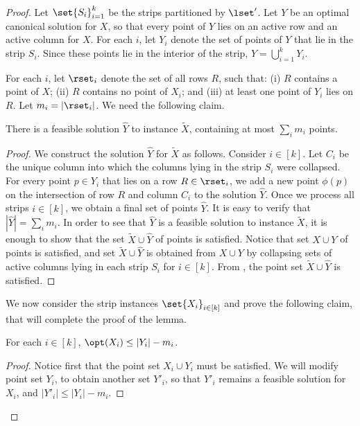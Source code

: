 \begin{proof}        

Let $\set{S_i}_{i=1}^k$ be the strips partitioned by $\lset'$. 
Let $Y$ be an optimal canonical solution for $X$, so that every point of $Y$ lies on an active row and an active column for $X$. For each $i$, let $Y_i$ denote the set of points of $Y$ that lie in the strip $S_i$. Since these points  lie in the interior of the strip,  $Y = \bigcup_{i=1}^k Y_i$. 
        
        
        For each $i$, let $\rset_i$ denote the set of all rows $R$, such that: (i) $R$ contains a point of $X$; (ii) $R$ contains no point of $X_i$; and (iii) at least one point of $Y_i$ lies on $R$. Let $m_i=|\rset_i|$.
      We need the following claim.
         
        \begin{claim}
                There is a feasible solution $\hat{Y}$ to instance $\tilde{X}$, containing at most $\sum_{i} m_i$ points. 
        \end{claim}
        \begin{proof}
                We construct the solution $\hat{Y}$ for $\tilde{X}$ as follows. 
                Consider $i \in [k]$. Let $C_i$ be the unique column into which the columns lying in the strip $S_i$ were collapsed. For every point $p\in Y_i$ that lies on a row $R\in\rset_i$, we add a new point $\phi(p)$ on the intersection of row $R$ and column $C_i$ to the solution $\hat Y$. Once we process all strips $i \in [k]$, we obtain a final set of points $\hat Y$. It is easy to verify that  $|\hat{Y}| = \sum_i m_i$. 
In order to see that $\hat Y$ is a feasible solution to instance $\tilde{X}$, it is enough to show that the set $\tilde{X}\cup \hat Y$ of points is satisfied. 
Notice that set $X\cup Y$ of points is satisfied, and set $\tilde{X}\cup \hat Y$ is obtained from $X\cup Y$ by collapsing sets of active columns lying in each strip $S_i$ for $i \in [k]$. 
From , the point set $\tilde{X}\cup \hat Y$ is satisfied.  
\end{proof}
        
        We now consider the strip instances $\set{X_i}_{i\in [k]}$ and prove the following claim, that will complete the proof of the lemma. 
        
        \begin{claim}\label{claim:opt y-m}
                For each $i \in [k]$, $\opt(X_i) \leq |Y_i| - m_i$. 
        \end{claim}
       \begin{proof}
                Notice first that the point set $X_i \cup Y_i$ must be satisfied. 
                We will modify point set $Y_i$, to obtain another set $Y'_i$, so that $Y'_i$ remains a feasible solution for $X_i$, and $|Y'_i| \le |Y_i| - m_i$.
                

\end{proof}
\end{proof}
